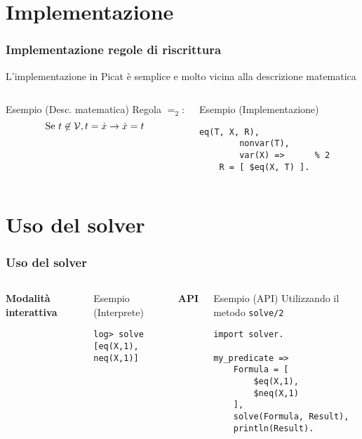 \documentclass{beamer}
\begin{document}
\section{Implementazione}


\begin{frame}[fragile]
  \frametitle{Implementazione regole di riscrittura} L'implementazione
  in Picat è semplice e molto vicina alla descrizione matematica
  \begin{columns}[c]
    \begin{exampleblock}{Esempio (Desc. matematica)}
      Regola $=_2$:
      \[
      \text{Se }t \not\in \mathcal{V}, t = \dot{x} \to \dot{x} = t
      \]
    \end{exampleblock}
    
    \begin{exampleblock}{Esempio (Implementazione)}
\begin{verbatim}
eq(T, X, R), 
        nonvar(T),
        var(X) =>      % 2
    R = [ $eq(X, T) ].
\end{verbatim}
    \end{exampleblock}
  \end{columns}
\end{frame}

\section{Uso del solver}

\begin{frame}[fragile]
  \frametitle{Uso del solver}
  \begin{columns}[c]
    \textbf{Modalità interattiva}
    \begin{exampleblock}{Esempio (Interprete)}
\begin{verbatim}
log> solve 
[eq(X,1), neq(X,1)]
\end{verbatim}
    \end{exampleblock}

    \textbf{API}
    \begin{exampleblock}{Esempio (API)}
      Utilizzando il metodo \texttt{solve/2}
\begin{verbatim}
import solver.

my_predicate =>
    Formula = [ 
        $eq(X,1), 
        $neq(X,1) 
    ],
    solve(Formula, Result),
    println(Result).
\end{verbatim}
    \end{exampleblock}
  \end{columns}
\end{frame}
\end{document}
